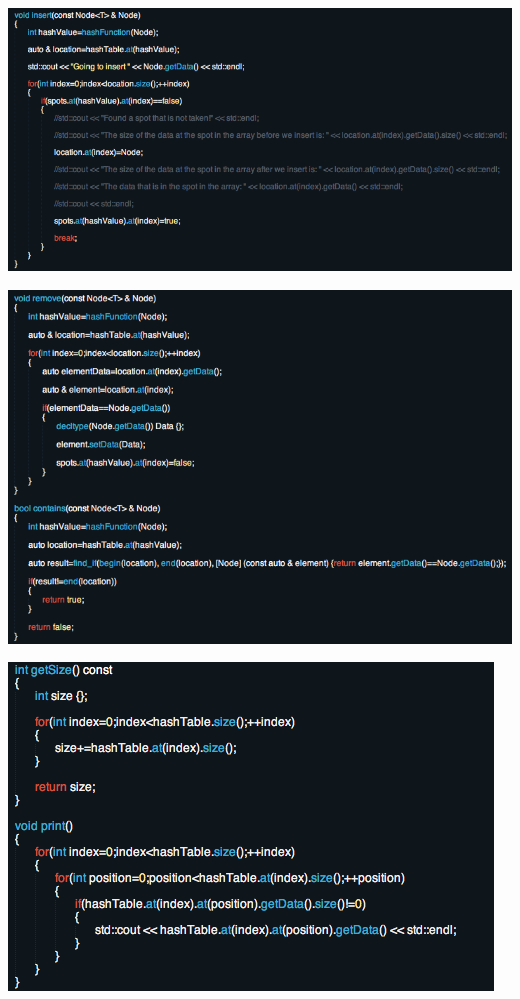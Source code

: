 \documentclass [12pt, executivepaper]{article}
\begin{document}
\begin{enumerate}
\includegraphics[scale=0.5]{HashTableHeaderfilePart2}

\pagebreak

\vspace*{-40mm}

\includegraphics[scale=0.5]{HashTableHeaderfilePart3}

\includegraphics[scale=0.5]{HashTableHeaderfilePart4}


\end{enumerate}
\end{document}
